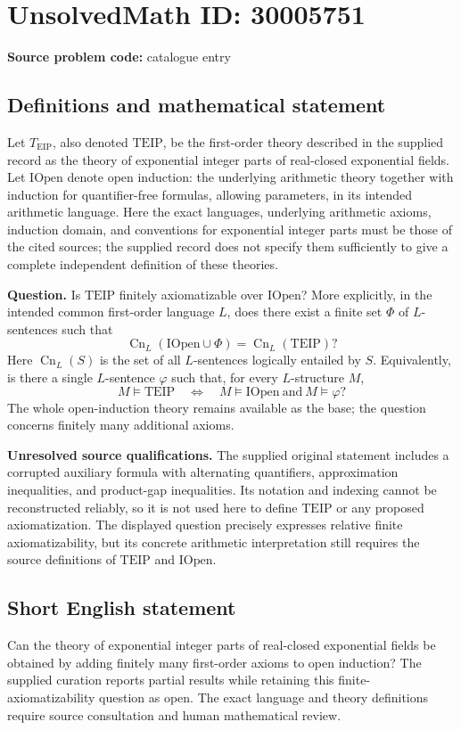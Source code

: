 \documentclass[11pt]{article}
\begin{document}
\section*{UnsolvedMath ID: 30005751}
\textbf{Source problem code:} catalogue entry
\subsection{Definitions and mathematical statement}
Let \(T_{\mathrm{EIP}}\), also denoted \(\mathrm{TEIP}\), be the first-order theory described in the supplied record as the theory of exponential integer parts of real-closed exponential fields. Let \(\mathrm{IOpen}\) denote open induction: the underlying arithmetic theory together with induction for quantifier-free formulas, allowing parameters, in its intended arithmetic language. Here the exact languages, underlying arithmetic axioms, induction domain, and conventions for exponential integer parts must be those of the cited sources; the supplied record does not specify them sufficiently to give a complete independent definition of these theories.

\textbf{Question.} Is \(\mathrm{TEIP}\) finitely axiomatizable over \(\mathrm{IOpen}\)? More explicitly, in the intended common first-order language \(L\), does there exist a finite set \(\Phi\) of \(L\)-sentences such that
\[
\operatorname{Cn}_{L}(\mathrm{IOpen}\cup\Phi)
=
\operatorname{Cn}_{L}(\mathrm{TEIP})?
\]
Here \(\operatorname{Cn}_{L}(S)\) is the set of all \(L\)-sentences logically entailed by \(S\). Equivalently, is there a single \(L\)-sentence \(\varphi\) such that, for every \(L\)-structure \(M\),
\[
M\models\mathrm{TEIP}
\quad\Longleftrightarrow\quad
M\models\mathrm{IOpen}\ \text{and}\ M\models\varphi?
\]
The whole open-induction theory remains available as the base; the question concerns finitely many additional axioms.

\textbf{Unresolved source qualifications.} The supplied original statement includes a corrupted auxiliary formula with alternating quantifiers, approximation inequalities, and product-gap inequalities. Its notation and indexing cannot be reconstructed reliably, so it is not used here to define \(\mathrm{TEIP}\) or any proposed axiomatization. The displayed question precisely expresses relative finite axiomatizability, but its concrete arithmetic interpretation still requires the source definitions of \(\mathrm{TEIP}\) and \(\mathrm{IOpen}\).
\subsection{Short English statement}
Can the theory of exponential integer parts of real-closed exponential fields be obtained by adding finitely many first-order axioms to open induction? The supplied curation reports partial results while retaining this finite-axiomatizability question as open. The exact language and theory definitions require source consultation and human mathematical review.
\end{document}
